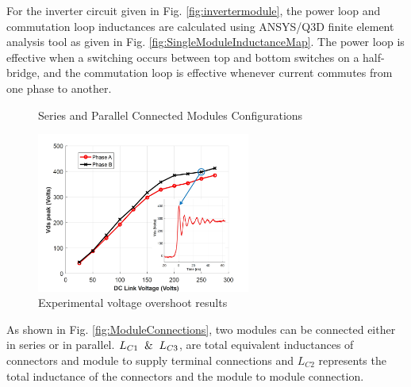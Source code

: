 For the inverter circuit given in Fig. \ref{fig:invertermodule}, the power loop and commutation loop inductances are calculated using ANSYS/Q3D finite element analysis tool as given in Fig. \ref{fig:SingleModuleInductanceMap}. The power loop is effective when a switching occurs between top and bottom switches on a half-bridge, and the commutation loop is effective whenever current commutes from one phase to another.

\begin{figure}[tb]
\begin{minipage}[b]{0.6\linewidth}
\centering
{}\quad
{}
\caption{\label{fig:ModuleConnections}Series and Parallel Connected Modules Configurations}
\end{minipage}
\begin{minipage}[b]{0.4\linewidth}
\centering
\includegraphics[width=7cm]{figures/experimentalvds2.jpg}
\caption{Experimental voltage overshoot results}
\label{fig:experimentalvds2}
\end{minipage}
\end{figure}

As shown in Fig. \ref{fig:ModuleConnections}, two modules can be connected either in series or in parallel. $L_{C1} \And L_{C3}$, are total equivalent inductances of connectors and module to supply terminal connections and $L_{C2}$ represents the total inductance of the connectors and the module to module connection.
